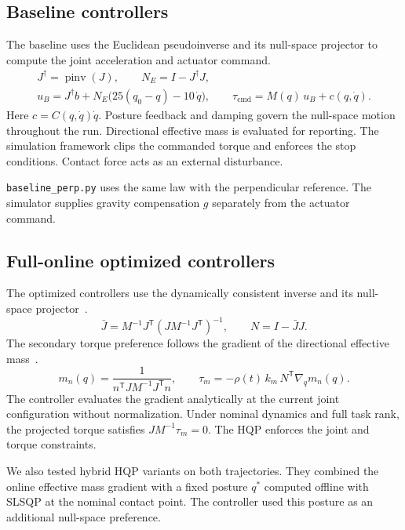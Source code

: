\documentclass[12pt,a4paper]{article}
\newcommand{\pinv}{\operatorname{pinv}}
\begin{document}
\subsection{Baseline controllers}
The baseline uses the Euclidean pseudoinverse and its null-space projector to compute
the joint acceleration and actuator command.
\begin{gather}
  J^\dagger = \pinv(J), \qquad N_E = I - J^\dagger J, \\
  u_B = J^\dagger b + N_E \bigl( 25 (q_0 - q) - 10\, \dot q \bigr), \qquad
  \tau_{\mathrm{cmd}} = M(q)\, u_B + c(q, \dot q).
\end{gather}
Here $c = C(q,\dot q)\dot q$. Posture feedback and damping govern the null-space
motion throughout the run. Directional effective mass is evaluated for reporting.
The simulation framework clips the commanded torque and enforces the stop conditions.
Contact force acts as an external disturbance.

\texttt{baseline\_perp.py} uses the same law with the perpendicular reference. The simulator
supplies gravity compensation $g$ separately from the actuator command.

\subsection{Full-online optimized controllers}
The optimized controllers use the dynamically consistent inverse and its
null-space projector~\cite{khatib1987}.
\begin{equation}
  \bar J = M^{-1} J^{\mathsf T} \left( J M^{-1} J^{\mathsf T} \right)^{-1}, \qquad
  N = I - \bar J J .
\end{equation}
The secondary torque preference follows the gradient of the directional effective
mass~\cite{haddadin2017}.
\begin{equation}
  m_n(q) = \frac{1}{n^{\mathsf T} J M^{-1} J^{\mathsf T} n}, \qquad
  \tau_m = -\rho(t)\, k_m\, N^{\mathsf T} \nabla_q m_n(q).
\end{equation}
The controller evaluates the gradient analytically at the current joint
configuration without normalization. Under nominal dynamics and full task rank,
the projected torque satisfies $J M^{-1} \tau_m = 0$. The HQP enforces the joint
and torque constraints.

We also tested hybrid HQP variants on both trajectories. They combined the online
effective mass gradient with a fixed posture $q^*$ computed offline with SLSQP at the
nominal contact point. The controller used this posture as an additional null-space
preference.
\end{document}
